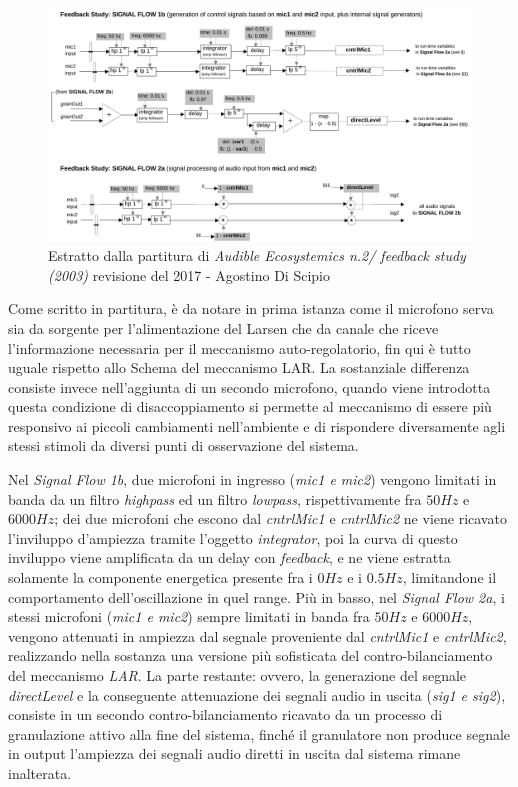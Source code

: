 \begin{figure}[h!]
\begin{center}
\includegraphics[width=14cm]{figures/LARFeedbackstudy2017.pdf}
\caption{Estratto dalla partitura di \textit{Audible Ecosystemics n.2/ feedback study (2003)}
revisione del 2017 - Agostino Di Scipio}
\vspace{0.5cm}
\end{center}
\end{figure}

Come scritto in partitura, è da notare in prima istanza
come il microfono serva sia da sorgente per l'alimentazione del Larsen che
da canale che riceve l'informazione necessaria per il meccanismo auto-regolatorio,
fin qui è tutto uguale rispetto allo Schema del meccanismo LAR.
La sostanziale differenza consiste invece nell'aggiunta di un secondo microfono,
quando viene introdotta questa condizione di disaccoppiamento si 
permette al meccanismo di essere più responsivo ai piccoli cambiamenti nell'ambiente
e di rispondere diversamente agli stessi stimoli da diversi punti di osservazione del sistema.

Nel \emph{Signal Flow 1b}, due microfoni in ingresso (\emph{mic1 e mic2}) 
vengono limitati in banda da un filtro \emph{highpass} ed 
un filtro \emph{lowpass}, rispettivamente fra $50Hz$ e $6000Hz$; dei due microfoni che escono 
dal \emph{cntrlMic1} e \emph{cntrlMic2} ne viene ricavato l'inviluppo d'ampiezza tramite
l'oggetto \emph{integrator}, poi la curva di questo inviluppo viene amplificata da 
un delay con \emph{feedback}, e ne viene estratta solamente la componente energetica 
presente fra i $0Hz$ e i $0.5Hz$, limitandone il comportamento dell'oscillazione in quel range.
Più in basso, nel \emph{Signal Flow 2a}, i stessi microfoni (\emph{mic1 e mic2}) sempre
limitati in banda fra $50Hz$ e $6000Hz$, vengono attenuati in ampiezza dal segnale
proveniente dal \emph{cntrlMic1} e \emph{cntrlMic2}, realizzando nella sostanza una 
versione più sofisticata del contro-bilanciamento del meccanismo \emph{LAR}.
La parte restante: ovvero, la generazione del segnale \emph{directLevel} e la 
conseguente attenuazione dei segnali audio in uscita (\emph{sig1 e sig2}),
consiste in un secondo contro-bilanciamento ricavato da un processo di granulazione
attivo alla fine del sistema, finché il granulatore non produce segnale in output 
l'ampiezza dei segnali audio diretti in uscita dal sistema rimane inalterata.

